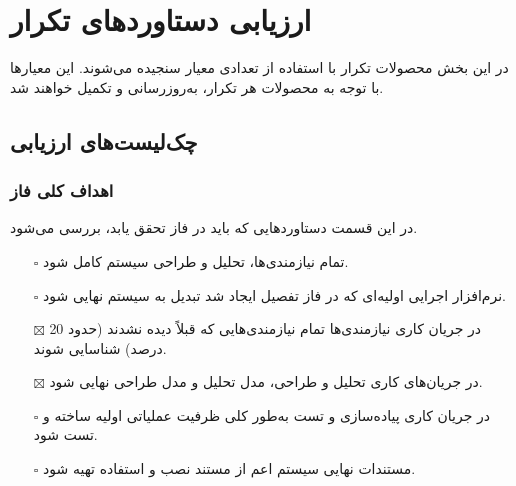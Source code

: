 \chapter{ارزیابی دستاوردهای تکرار}
در این بخش محصولات تکرار با استفاده از تعدادی معیار سنجیده می‌شوند. این معیارها با توجه به محصولات هر تکرار، به‌روزرسانی و تکمیل خواهند شد.
\section{چک‌لیست‌های ارزیابی}

\iffalse
Item icons for checklists:	
	\item[$\square$]
	\item[$\boxtimes$]
\fi

\subsection{\hspace*{0.2cm}اهداف کلی فاز }
در این قسمت دستاوردهایی که باید در فاز  تحقق یابد، بررسی می‌شود.
\begin{itemize} \setlength\itemsep{0cm}
	\item[$\square$]
	تمام نیازمندی‌ها، تحلیل و طراحی سیستم کامل شود.
	\item[$\square$]
	نرم‌افزار اجرایی اولیه‌ای که در فاز تفصیل ایجاد شد تبدیل به سیستم نهایی شود.
	\item[$\boxtimes$]
	در جریان کاری نیازمندی‌ها تمام نیازمندی‌هایی که قبلاً دیده نشدند (حدود 20 درصد) شناسایی شوند.
	\item[$\boxtimes$]
	در جریان‌های کاری تحلیل و طراحی، مدل تحلیل و مدل طراحی نهایی شود.
	\item[$\square$]
	در جریان کاری پیاده‌سازی و تست به‌طور کلی ظرفیت عملیاتی اولیه ساخته و تست شود.
	\item[$\square$]
	مستندات نهایی سیستم اعم از مستند نصب و استفاده تهیه شود.
	
\end{itemize}

